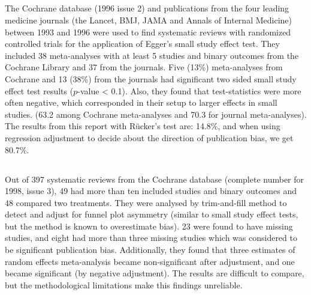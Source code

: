 \documentclass[11pt,a4paper,twoside]{book}\usepackage[]{graphicx}\usepackage[]{color}
\begin{document}
\subsection{\citet{Egger}}
The Cochrane database (1996 issue 2) and publications from the four leading medicine journals (the Lancet, BMJ, JAMA and Annals of Internal Medicine) between 1993 and 1996 were used to find systematic reviews with randomized controlled trials for the application of Egger's small study effect test. They included 38 meta-analyses with at least 5 studies and binary outcomes from the Cochrane Library and 37 from the journals. Five (13\%) meta-analyses from Cochrane and 13 (38\%) from the journals had significant two sided small study effect test results ($p$-value < 0.1). Also, they found that test-statistics were more often negative, which corresponded in their setup to larger effects in small studies. (63.2 among Cochrane meta-analyses and 70.3 for journal meta-analyses). The results from this report with R\"ucker's test are: 14.8\%, and when using regression adjustment to decide about the direction of publication bias, we get 80.7\%.


\subsection{\citet{sutton.2000}}
Out of 397 systematic reviews from the Cochrane database (complete number for 1998, issue 3), 49 had more than ten included studies and binary outcomes and 48 compared two treatments. They were analysed by trim-and-fill method \citep{trimfill} to detect and adjust for funnel plot asymmetry (similar to small study effect tests, but the method is known to overestimate bias). 23 were found to have missing studies, and eight had more than three missing studies which was considered to be significant publication bias. Additionally, they found that three estimates of random effects meta-analysis became non-significant after adjustment, and one became significant (by negative adjustment). The results are difficult to compare, but the methodological limitations make this findings unreliable.
\end{document}
